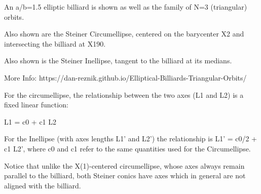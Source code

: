 An a/b=1.5 elliptic billiard is shown as well as the family of N=3 (triangular) orbits.

Also shown are the Steiner Circumellipse, centered on the barycenter X2 and intersecting the billiard at X190.

Also shown is the Steiner Inellipse, tangent to the billiard at its medians.

More Info:  https://dan-reznik.github.io/Elliptical-Billiards-Triangular-Orbits/

For the circumellipse, the relationship between the two axes (L1 and L2) is a fixed linear function:

L1 = c0 + c1 L2

For the Inellipse (with axes lengths L1' and L2') the relationship is L1' = c0/2 + c1 L2', where c0 and c1 refer to the same quantities used for the Circumellipse.

Notice that unlike the X(1)-centered circumellipse, whose axes always remain parallel to the billiard, both Steiner conics have axes which in general are not aligned with the billiard.